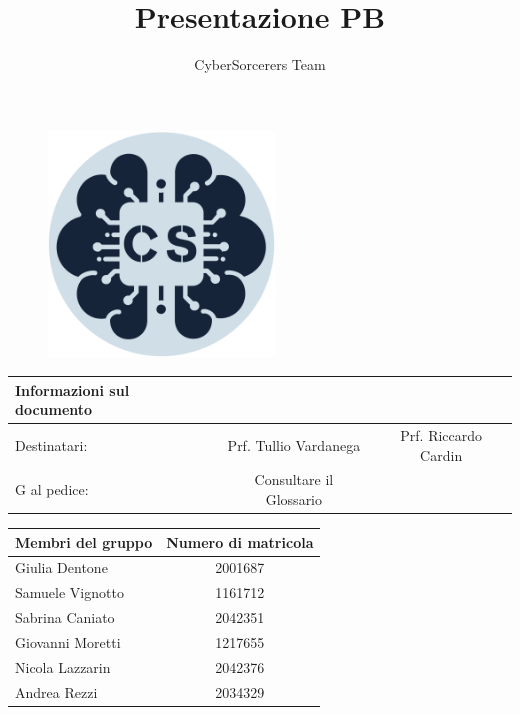 \documentclass{article}
\title{\Huge{\textbf{Presentazione PB}}\vspace{-1em}}
\author{CyberSorcerers Team}
\date{}
\begin{document}
\maketitle
\vspace{-3em}
\begin{figure}[h]
  \centering
  \includegraphics[width=6cm, height=6cm]{documenti/logo rotondo.png}
  \label{fig:immagine}
\end{figure}


\begin{center}
    \begin{tabular}{|l c c|}
    \hline
        \rowcolor{Blue} 
        \textbf{Informazioni sul documento} & &\\ [1 ex]
        \hline
        \rowcolor{LighterBlue}
        Destinatari: & Prf. Tullio Vardanega & Prf. Riccardo Cardin \\ [1 ex]
        \hline
        \rowcolor{LightBlue}
        G al pedice: & Consultare il Glossario & \\ [1 ex]
        \hline
    \end{tabular}
\end{center}


\begin{center}
    \begin{tabular}{|l|c|}
    \hline
        \rowcolor{Blue} 
        \textbf{Membri del gruppo} & \textbf{Numero di matricola} \\ [1 ex]
        \hline
        \rowcolor{LighterBlue}
        Giulia Dentone & 2001687\\ [1 ex]
        \hline
        \rowcolor{LightBlue}
        Samuele Vignotto & 1161712 \\ [1 ex]
        \hline
        \rowcolor{LighterBlue}
        Sabrina Caniato & 2042351\\ [1 ex]
        \hline
        \rowcolor{LightBlue}
        Giovanni Moretti & 1217655 \\ [1 ex]
        \hline
        \rowcolor{LighterBlue}
        Nicola Lazzarin & 2042376\\ [1 ex]
        \hline
        \rowcolor{LightBlue}
        Andrea Rezzi & 2034329\\ [1 ex]
        \hline
    \end{tabular}
\end{center}
\end{document}
